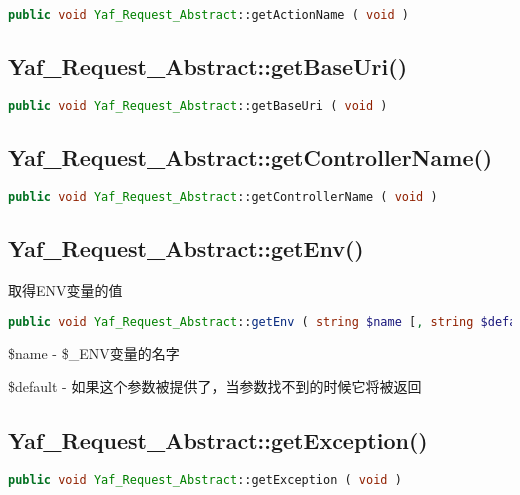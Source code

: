 \begin{lstlisting}[language=PHP]
public void Yaf_Request_Abstract::getActionName ( void )
\end{lstlisting}



\subsection{Yaf\_Request\_Abstract::getBaseUri()}




\begin{lstlisting}[language=PHP]
public void Yaf_Request_Abstract::getBaseUri ( void )
\end{lstlisting}




\subsection{Yaf\_Request\_Abstract::getControllerName()}



\begin{lstlisting}[language=PHP]
public void Yaf_Request_Abstract::getControllerName ( void )
\end{lstlisting}



\subsection{Yaf\_Request\_Abstract::getEnv()}


取得ENV变量的值

\begin{lstlisting}[language=PHP]
public void Yaf_Request_Abstract::getEnv ( string $name [, string $default ] )
\end{lstlisting}

\begin{compactitem}
\item \$name - \$\_ENV变量的名字
\item \$default - 如果这个参数被提供了，当参数找不到的时候它将被返回
\end{compactitem}

\subsection{Yaf\_Request\_Abstract::getException()}




\begin{lstlisting}[language=PHP]
public void Yaf_Request_Abstract::getException ( void )
\end{lstlisting}



